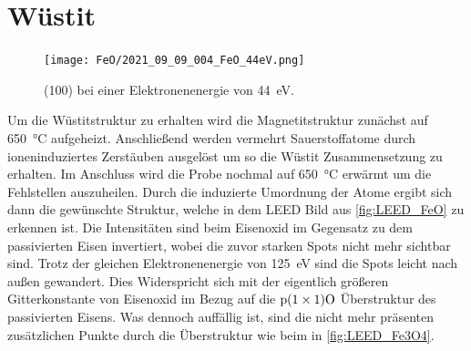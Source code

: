     \section{Wüstit}
        \begin{figure}
            \centering
            \texttt{[image: FeO/2021\_09\_09\_004\_FeO\_44eV.png]}
            \caption{ (100) bei einer Elektronenenergie von \SI{44}{\electronvolt}.}
            \label{fig:LEED_FeO}
        \end{figure}
        Um die Wüstitstruktur zu erhalten wird die Magnetitstruktur zunächst auf \SI{650}{\celsius} aufgeheizt.
        Anschließend werden vermehrt Sauerstoffatome durch ioneninduziertes Zerstäuben ausgelöst um so die Wüstit Zusammensetzung zu erhalten.
        Im Anschluss wird die Probe nochmal auf \SI{650}{\celsius} erwärmt um die Fehlstellen auszuheilen.
        Durch die induzierte Umordnung der Atome ergibt sich dann die gewünschte Struktur, welche in dem LEED Bild aus \autoref{fig:LEED_FeO} zu erkennen ist.
        Die Intensitäten sind beim Eisenoxid im Gegensatz zu dem passivierten Eisen invertiert, wobei die zuvor starken Spots nicht mehr sichtbar sind.
        Trotz der gleichen Elektronenenergie von \SI{125}{\electronvolt} sind die Spots leicht nach außen gewandert.
        Dies Widerspricht sich mit der eigentlich größeren Gitterkonstante von Eisenoxid im Bezug auf die $\text{p}(1 \times 1)\ce{O}$ Überstruktur des passivierten Eisens.
        Was dennoch auffällig ist, sind die nicht mehr präsenten zusätzlichen Punkte durch die Überstruktur wie beim  in \autoref{fig:LEED_Fe3O4}.

